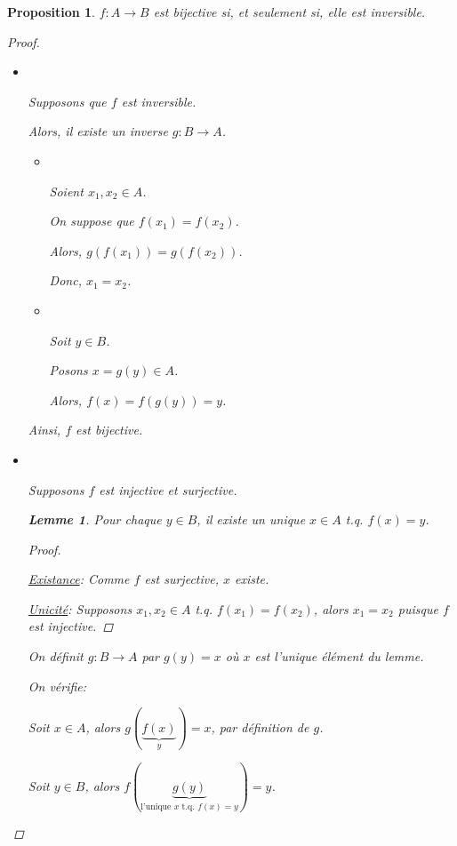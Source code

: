 \documentclass{report}
\newtheorem*{lem}{Lemme}
\newtheorem*{prop}{Proposition}
\theoremstyle{definition}
\theoremstyle{remark}
\begin{document}
	\begin{prop}
		$f:A \to B$ est bijective \emph{si, et seulement si,} elle est inversible.

		\begin{proof}~

			\begin{itemize}
				\item[$\Leftarrow$:] ~

				Supposons que $f$ est inversible.

				Alors, il existe un inverse $g:B \to A$.

				\begin{itemize}
					\item[(inj):] ~

					Soient $x_1,x_2 \in A$.

					On suppose que $f(x_1)=f(x_2)$.

					Alors, $g(f(x_1)) = g(f(x_2))$.

					Donc, $x_1 = x_2$.
					\item[(surj):] ~

					Soit $y \in B$.

					Posons $x=g(y) \in A$.

					Alors, $f(x)=f(g(y))=y$.
				\end{itemize}

				Ainsi, $f$ est bijective.
				\item[$\Rightarrow$:] ~

				Supposons $f$ est injective et surjective.

				\begin{lem}
					Pour \emph{chaque} $y \in B$, il existe un \emph{unique} $x \in A$ t.q. $f(x)=y$.

					\renewcommand{\qedsymbol}{$\blacksquare$}
					\begin{proof}~

						\underline{Existance}:
						Comme $f$ est surjective, $x$ existe.

						\underline{Unicit\'e}:
						Supposons $x_1,x_2 \in A$ t.q. $f(x_1)=f(x_2)$, alors $x_1=x_2$ puisque $f$ est injective.
					\end{proof}
					\renewcommand{\qedsymbol}{$\square$}
				\end{lem}

				On d\'efinit $g:B \to A$ par $g(y)=x$ o\`u $x$ est l'unique \'el\'ement du lemme.

				On v\'erifie:

				Soit $x \in A$, alors $g(\underbrace{f(x)}_y)=x$, par d\'efinition de $g$.

				Soit $y \in B$, alors $f(\underbrace{g(y)}_{\text{l'unique $x$ t.q. $f(x)=y$}})=y$.
			\end{itemize}
		\end{proof}
	\end{prop}
\end{document}
